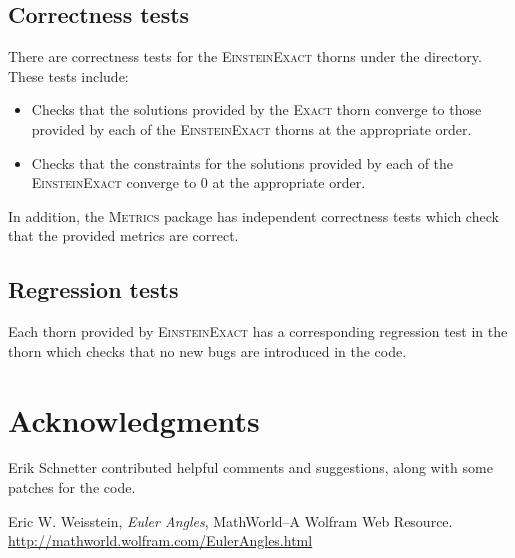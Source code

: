 \documentclass{article}
\begin{document}
\subsection{Correctness tests}
There are correctness tests for the \textsc{EinsteinExact} thorns under the
 directory. These tests include:
\begin{itemize}
\item Checks that the solutions provided by the \textsc{Exact} thorn converge
  to those provided by each of the \textsc{EinsteinExact} thorns at the appropriate order.
\item Checks that the constraints for the solutions provided by each of the
 \textsc{EinsteinExact} converge to $0$ at the appropriate order.
\end{itemize}
In addition, the \textsc{Metrics} package has independent correctness tests
which check that the provided metrics are correct.

\subsection{Regression tests}
Each thorn provided by \textsc{EinsteinExact} has a corresponding regression
test in the  thorn which checks that no new bugs are
introduced in the code.

\section{Acknowledgments}
Erik Schnetter contributed helpful comments and suggestions, along with some
patches for the code.

\begin{thebibliography}{{Pen}}

{Eric W. Weisstein, {\em Euler Angles}, MathWorld--A Wolfram Web Resource. \url{http://mathworld.wolfram.com/EulerAngles.html}}

\end{thebibliography}

\end{document}
